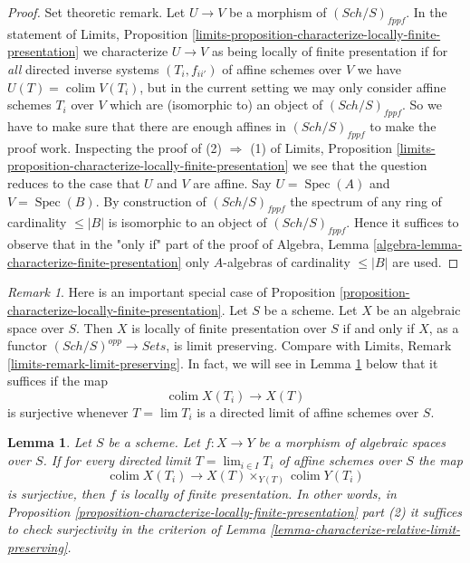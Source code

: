 \documentclass{stacks-project}
\theoremstyle{plain}
\newtheorem{lemma}[subsection]{Lemma}
\theoremstyle{definition}
\theoremstyle{remark}
\newtheorem{remark}[subsection]{Remark}
\numberwithin{equation}{subsection}
\def\lim{\mathop{\mathrm{lim}}\nolimits}
\def\colim{\mathop{\mathrm{colim}}\nolimits}
\def\Spec{\mathop{\mathrm{Spec}}}
\def\Sch{\mathit{Sch}}
\begin{document}
\begin{proof}
\medskip\noindent
Set theoretic remark. Let $U \to V$ be a morphism of
$(\Sch/S)_{fppf}$. In the statement of
Limits, Proposition
\ref{limits-proposition-characterize-locally-finite-presentation}
we characterize $U \to V$ as being locally of finite presentation
if for {\it all} directed inverse systems $(T_i, f_{ii'})$ of affine schemes
over $V$ we have $U(T) = \colim V(T_i)$, but in the current setting
we may only consider affine schemes $T_i$ over $V$ which are (isomorphic to)
an object of $(\Sch/S)_{fppf}$. So we have to make sure that there
are enough affines in $(\Sch/S)_{fppf}$ to make the proof work.
Inspecting the proof of (2) $\Rightarrow$ (1) of
Limits, Proposition
\ref{limits-proposition-characterize-locally-finite-presentation}
we see that the question reduces to the case that $U$ and $V$ are affine.
Say $U = \Spec(A)$ and $V = \Spec(B)$. By construction
of $(\Sch/S)_{fppf}$ the spectrum of any ring of cardinality
$\leq |B|$ is isomorphic to an object of $(\Sch/S)_{fppf}$.
Hence it suffices to observe that in the "only if" part of the proof of
Algebra, Lemma \ref{algebra-lemma-characterize-finite-presentation}
only $A$-algebras of cardinality $\leq |B|$ are used.
\end{proof}

\begin{remark}
\label{remark-limit-preserving}
Here is an important special case of
Proposition \ref{proposition-characterize-locally-finite-presentation}.
Let $S$ be a scheme. Let $X$ be an algebraic space over $S$.
Then $X$ is locally of finite presentation over $S$ if and only
if $X$, as a functor $(\Sch/S)^{opp} \to \textit{Sets}$,
is limit preserving. Compare with
Limits, Remark \ref{limits-remark-limit-preserving}.
In fact, we will see in Lemma \ref{lemma-surjection-is-enough}
below that it suffices if the map
$$
\colim X(T_i) \longrightarrow X(T)
$$
is surjective whenever $T = \lim T_i$ is a directed limit of
affine schemes over $S$.
\end{remark}

\begin{lemma}
\label{lemma-surjection-is-enough}
Let $S$ be a scheme.
Let $f : X \to Y$ be a morphism of algebraic spaces over $S$.
If for every directed limit $T = \lim_{i \in I} T_i$
of affine schemes over $S$ the map
$$
\colim X(T_i) \longrightarrow X(T) \times_{Y(T)} \colim Y(T_i)
$$
is surjective, then $f$ is locally of finite presentation.
In other words, in
Proposition \ref{proposition-characterize-locally-finite-presentation}
part (2) it suffices to check surjectivity in the criterion of
Lemma \ref{lemma-characterize-relative-limit-preserving}.
\end{lemma}
\end{document}
